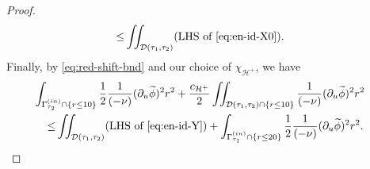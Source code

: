 \documentclass[10pt, reqno]{amsart}
\theoremstyle{definition}
\theoremstyle{remark}
\theoremstyle{conjecture}
\numberwithin{equation}{section}
\newcommand{\set}[1]{\{#1\}}
\newcommand{\rd}{\partial}
\newcommand{\0}{\emptyset}
\newcommand{\Gmm}{\Gamma}
\newcommand{\calD}{\mathcal D}
\newcommand{\calH}{\mathcal H}
\newcommand{\dur}{\nu}
\newcommand{\f}{\frac}
\newcommand{\EH}{\calH^{+}}
\newcommand{\phibg}{\overline{\phi}}				%
\newcommand{\phidf}{\widetilde{\phi}}				%
\begin{document}
\begin{proof}
\begin{equation}
\begin{aligned}
	\leq & \iint_{\calD(\tau_{1}, \tau_{2})} (\hbox{LHS of \eqref{eq:en-id-X0}}).
\end{aligned}\end{equation}
Finally, by \eqref{eq:red-shift-bnd} and our choice of $\chi_{\EH}$, we have
\begin{equation} \label{eq:en-w-ctrl-Y}
\begin{aligned}
& \hskip-2em
	\int_{\Gmm_{\tau_{2}}^{(in)} \cap \set{r \leq 10}} \frac{1}{2} \frac{1}{(-\dur)} (\rd_{u} \phidf)^{2} r^{2}
	+  \f{c_{\EH}}{2} \iint_{\calD(\tau_{1}, \tau_{2}) \cap \set{r \leq 10}} \frac{1}{(-\dur)} (\rd_{u} \phidf)^{2} r^{2} \\
	\leq & \iint_{\calD(\tau_{1}, \tau_{2})} (\hbox{LHS of \eqref{eq:en-id-Y}})
	+ \int_{\Gmm_{\tau_{1}}^{(in)} \cap \set{r \leq 20}} \frac{1}{2} \frac{1}{(-\dur)} (\rd_{u} \phidf)^{2} r^{2}.
\end{aligned}
\end{equation}


\end{proof}
\end{document}
